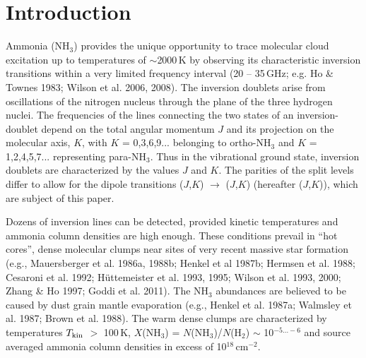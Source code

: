 \documentclass[oldversion]{aa}
\begin{document}



\maketitle


\section{Introduction}

Ammonia (NH$_3$) provides the unique opportunity to trace molecular cloud
excitation up to temperatures of $\sim $2000\,K by observing its
characteristic inversion transitions within a very limited frequency 
interval (20 -- 35\,GHz; e.g. Ho \& Townes 1983; Wilson et al. 2006,
2008). The inversion doublets arise from oscillations of the 
nitrogen nucleus through the plane of the three hydrogen nuclei. 
The frequencies of the lines connecting the two states of an
inversion-doublet depend on the total angular momentum $J$ and its 
projection on the molecular axis, $K$, with $K$ = 0,3,6,9... belonging 
to ortho-NH$_3$ and $K$ = 1,2,4,5,7...  representing para-NH$_3$. 
Thus in the vibrational ground state, inversion doublets are characterized 
by the values $J$ and $K$. The parities of the split levels differ to
allow for the dipole transitions ($J$,$K$) $\rightarrow$ ($J$,$K$)
(hereafter ($J$,$K$)), which are subject of this paper. 

Dozens of inversion lines can be detected, provided kinetic temperatures 
and ammonia column densities are high enough. These conditions prevail
in ``hot cores'', dense molecular clumps near sites of very recent massive 
star formation (e.g., Mauersberger et al. 1986a, 1988b; Henkel et al 1987b; 
Hermsen et al. 1988; Cesaroni et al. 1992; H{\"u}ttemeister et al. 1993, 
1995; Wilson et al. 1993, 2000; Zhang \& Ho 1997; Goddi et 
al. 2011). The NH$_3$ abundances are believed to be caused 
by dust grain mantle evaporation (e.g., Henkel et al. 1987a; Walmsley et al. 
1987; Brown et al. 1988). The warm dense clumps are characterized by 
temperatures $T_{\rm kin}$ $>$ 100\,K, $X$(NH$_3$) = $N$(NH$_3$)/$N$(H$_2$) 
$\sim$ 10$^{-5...-6}$ and source averaged ammonia column densities in 
excess of 10$^{18}$\,cm$^{-2}$.
\end{document}
